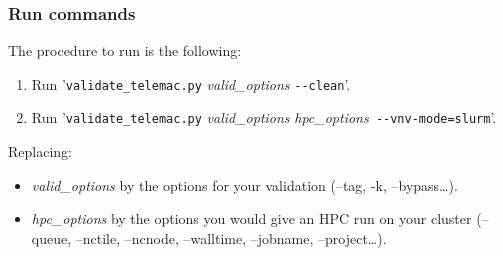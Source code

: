 \subsubsection{Run commands}

The procedure to run is the following:
\begin{enumerate}
  \item Run '\verb!validate_telemac.py! \textit{valid\_options} \verb!--clean!'.
  \item Run '\verb!validate_telemac.py! \textit{valid\_options}
    \textit{hpc\_options}\verb! --vnv-mode=slurm!'.
\end{enumerate}

Replacing:
\begin{itemize}
  \item \textit{valid\_options} by the options for your validation (--tag, -k,
    --bypass\ldots).
  \item \textit{hpc\_options} by the options you would give an HPC \tel run on
    your cluster (--queue, --nctile, --ncnode, --walltime, --jobname, --project\ldots).
\end{itemize}
